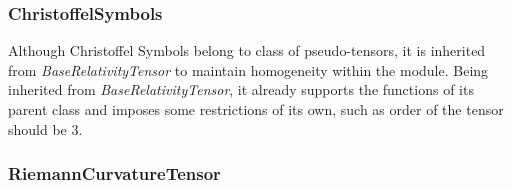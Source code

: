 \documentclass[onecolumn]{aa}
\begin{document}



\subsubsection{ChristoffelSymbols}\label{subsubsec:chl}

Although Christoffel Symbols belong to class of pseudo-tensors, it is inherited from \textit{BaseRelativityTensor} to maintain homogeneity within the module. Being inherited from \textit{BaseRelativityTensor}, it already supports the functions of its parent class and imposes some restrictions of its own, such as order of the tensor should be 3.




\subsubsection{RiemannCurvatureTensor}\label{subsubsec:riemann}
\end{document}
